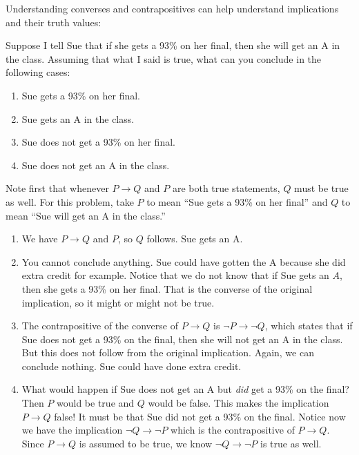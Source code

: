 \documentclass[11pt,]{book}
\theoremstyle{ptxplainnotitle}
\theoremstyle{ptxplaintitle}
\theoremstyle{ptxdefinitionnotitle}
\theoremstyle{ptxdefinitiontitle}
\theoremstyle{ptxdefinitionnotitle}
\theoremstyle{ptxdefinitiontitle}
\theoremstyle{ptxdefinitionnotitle}
\theoremstyle{ptxdefinitiontitle}
\theoremstyle{ptxdefinitiontitlenonumber}
\theoremstyle{ptxdefinitiontitlenonumber}
\numberwithin{equation}{chapter}
\newcommand{\imp}{\rightarrow}
\begin{document}
\hypertarget{p-1778}{}%
Understanding converses and contrapositives can help understand implications and their truth values:%
\begin{example}\label{example-52}
\hypertarget{p-1779}{}%
Suppose I tell Sue that if she gets a 93\% on her final, then she will get an A in the class. Assuming that what I said is true, what can you conclude in the following cases:%
\par
\hypertarget{p-1780}{}%
\leavevmode%
\begin{enumerate}
\item\hypertarget{li-755}{}\hypertarget{p-1781}{}%
Sue gets a 93\% on her final.%
\item\hypertarget{li-756}{}\hypertarget{p-1782}{}%
Sue gets an A in the class.%
\item\hypertarget{li-757}{}\hypertarget{p-1783}{}%
Sue does not get a 93\% on her final.%
\item\hypertarget{li-758}{}\hypertarget{p-1784}{}%
Sue does not get an A in the class.%
\end{enumerate}
%
\par\smallskip%
\noindent\textbf{}\hypertarget{solution-219}{}\hypertarget{p-1785}{}%
Note first that whenever \(P \imp Q\) and \(P\) are both true statements, \(Q\) must be true as well. For this problem, take \(P\) to mean ``Sue gets a 93\% on her final'' and \(Q\) to mean ``Sue will get an A in the class.''%
\par
\hypertarget{p-1786}{}%
\leavevmode%
\begin{enumerate}
\item\hypertarget{li-759}{}\hypertarget{p-1787}{}%
We have \(P \imp Q\) and \(P\), so \(Q\) follows. Sue gets an A.%
\item\hypertarget{li-760}{}\hypertarget{p-1788}{}%
You cannot conclude anything. Sue could have gotten the A because she did extra credit for example. Notice that we do not know that if Sue gets an \(A\), then she gets a 93\% on her final. That is the converse of the original implication, so it might or might not be true.%
\item\hypertarget{li-761}{}\hypertarget{p-1789}{}%
The contrapositive of the converse of \(P \imp Q\) is \(\neg P \imp \neg Q\), which states that if Sue does not get a 93\% on the final, then she will not get an A in the class. But this does not follow from the original implication. Again, we can conclude nothing. Sue could have done extra credit.%
\item\hypertarget{li-762}{}\hypertarget{p-1790}{}%
What would happen if Sue does not get an A but \emph{did} get a 93\% on the final? Then \(P\) would be true and \(Q\) would be false. This makes the implication \(P \imp Q\) false! It must be that Sue did not get a 93\% on the final. Notice now we have the implication \(\neg Q \imp \neg P\) which is the contrapositive of \(P \imp Q\). Since \(P \imp Q\) is assumed to be true, we know \(\neg Q \imp \neg P\) is true as well.%
\end{enumerate}
%
\end{example}
\end{document}
